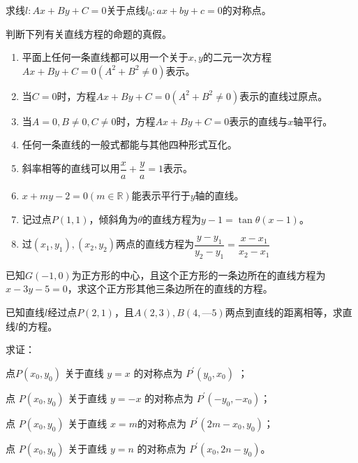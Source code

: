 \begin{example}
    求线\(l:Ax+By+C=0\)关于点线\(l_0:ax+by+c=0\)的对称点。
\end{example}






\clearpage
\review

\clearpage

\hw
\begin{homework}
    判断下列有关直线方程的命题的真假。
    \begin{enumerate}
        \setlength{\itemsep}{-\itemsep}
        \item 平面上任何一条直线都可以用一个关于\(x,y\)的二元一次方程\(Ax+By+C=0(A^2+B^2\neq 0)\)表示。
        \item 当\(C=0\)时，方程\(Ax+By+C=0(A^2+B^2\neq 0)\)表示的直线过原点。
        \item 当\(A=0,B\neq 0,C\neq 0\)时，方程\(Ax+By+C=0\)表示的直线与\(x\)轴平行。
        \item 任何一条直线的一般式都能与其他四种形式互化。
        \item 斜率相等的直线可以用\(\dfrac{x}{a}+\dfrac{y}{a}=1\)表示。
        \item \(x+my-2=0(m\in\mathbb{R})\)能表示平行于\(y\)轴的直线。
        \item 记过点\(P(1,1)\)，倾斜角为\(\theta\)的直线方程为\(y-1=\tan\theta(x-1)\)。
        \item 过\((x_1,y_1),(x_2,y_2)\)两点的直线方程为\(\dfrac{y-y_{1}}{y_{2}-y_{1}}=\dfrac{x-x_{1}}{x_{2}-x_{1}}\)
    \end{enumerate}
\end{homework}
\begin{homework}
已知$G(-1,0)$为正方形的中心，且这个正方形的一条边所在的直线方程为
$x-3y-5=0$，求这个正方形其他三条边所在的直线的方程。

\end{homework}
\begin{homework}
    已知直线\(l\)经过点$P(2,1)$，且$A(2,3),B(4,—5)$两点到直线的距离相等，求直线\(l\)的方程。
\end{homework}
\begin{homework}

\end{homework}
\begin{homework}求证：
    
    点$  P\left(x_{0}, y_{0}\right)$  关于直线 $ y=x $ 的对称点为 $ P^{\prime}\left(y_{0}, x_{0}\right)$ ；

 点  $P\left(x_{0}, y_{0}\right) $ 关于直线 $ y=-x $ 的对称点为 $ P^{\prime}\left(-y_{0},-x_{0}\right) $；

 点  $P\left(x_{0}, y_{0}\right) $ 关于直线 $ x=m $的对称点为 $ P^{\prime}\left(2 m-x_{0}, y_{0}\right) $；

 点 $ P\left(x_{0}, y_{0}\right) $ 关于直线 $ y=n $ 的对称点为 $ P^{\prime}\left(x_{0}, 2 n-y_{0}\right) $。
\end{homework}
